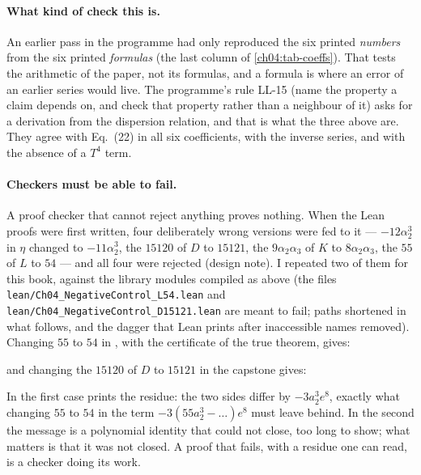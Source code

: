 \paragraph{What kind of check this is.}
An earlier pass in the programme had only reproduced the six printed \emph{numbers} from the six printed \emph{formulas} (the last column of \cref{ch04:tab-coeffs}).
That tests the arithmetic of the paper, not its formulas, and a formula is where an error of an earlier series would live.
The programme's rule LL-15 (name the property a claim depends on, and check that property rather than a neighbour of it) asks for a derivation from the dispersion relation, and that is what the three above are.
They agree with Eq.~(22) in all six coefficients, with the inverse series, and with the absence of a $T^4$ term.

\paragraph{Checkers must be able to fail.}
A proof checker that cannot reject anything proves nothing.
When the Lean proofs were first written, four deliberately wrong versions were fed to it --- $-12\alpha_2^3$ in $\eta$ changed to $-11\alpha_2^3$, the $15120$ of $D$ to $15121$, the $9\alpha_2\alpha_3$ of $K$ to $8\alpha_2\alpha_3$, the $55$ of $L$ to $54$ --- and all four were rejected (design note).
I repeated two of them for this book, against the library modules compiled as above (the files \texttt{lean/Ch04\_NegativeControl\_L54.lean} and \texttt{lean/Ch04\_NegativeControl\_D15121.lean} are meant to fail; paths shortened in what follows, and the dagger that Lean prints after inaccessible names removed).
Changing $55$ to $54$ in , with the certificate of the true theorem, gives:

\noindent and changing the $15120$ of $D$ to $15121$ in the capstone  gives:

\noindent In the first case  prints the residue: the two sides differ by $-3a_2^3e^8$, exactly what changing $55$ to $54$ in the term $-3(55a_2^3-\dots)e^8$ must leave behind.
In the second the message is a polynomial identity that  could not close, too long to show; what matters is that it was not closed.
A proof that fails, with a residue one can read, is a checker doing its work.

